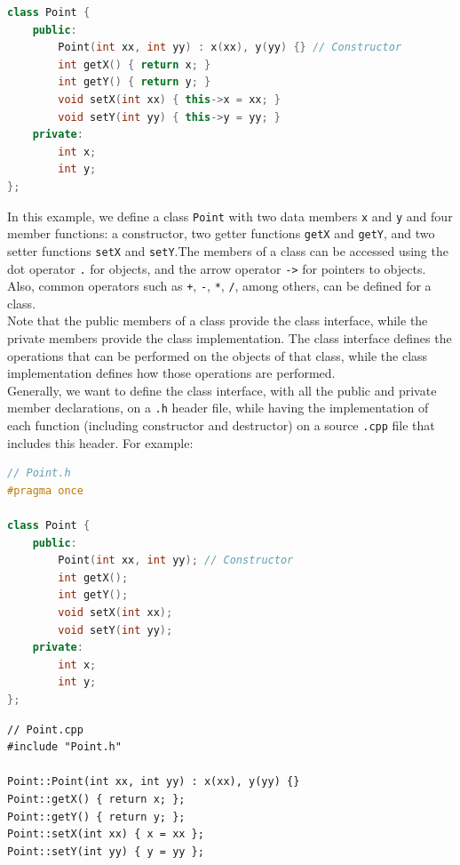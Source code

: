\begin{lstlisting}[language=C++]
class Point {
    public:
        Point(int xx, int yy) : x(xx), y(yy) {} // Constructor
        int getX() { return x; }
        int getY() { return y; }
        void setX(int xx) { this->x = xx; }
        void setY(int yy) { this->y = yy; }
    private:
        int x;
        int y;
};
\end{lstlisting}

In this example, we define a class \texttt{Point} with two data members \texttt{x}
and \texttt{y} and four member functions: a constructor, two getter functions
\texttt{getX} and \texttt{getY}, and two setter functions \texttt{setX} and
\texttt{setY}.The members of a class can be accessed using the dot operator 
\texttt{.} for objects, and the arrow operator \texttt{->} for pointers to objects. 
Also, common operators such as \texttt{+}, \texttt{-}, \texttt{*}, \texttt{/}, 
among others, can be defined for a class.\\

Note that the public members of a class provide the class interface, while the private
members provide the class implementation. The class interface defines the
operations that can be performed on the objects of that class, while the class
implementation defines how those operations are performed.\\

Generally, we want to define the class interface, with all the public and private
member declarations, on a \texttt{.h} header file, while having the implementation of each 
function (including constructor and destructor) on a source \texttt{.cpp} file that 
includes this header. For example:

\begin{lstlisting}[language=C++]
// Point.h
#pragma once

class Point {
    public:
        Point(int xx, int yy); // Constructor
        int getX();
        int getY();
        void setX(int xx);
        void setY(int yy);
    private:
        int x;
        int y;
};
\end{lstlisting}

\begin{lstlisting}
// Point.cpp
#include "Point.h"

Point::Point(int xx, int yy) : x(xx), y(yy) {}
Point::getX() { return x; };
Point::getY() { return y; };
Point::setX(int xx) { x = xx };
Point::setY(int yy) { y = yy };
\end{lstlisting}

